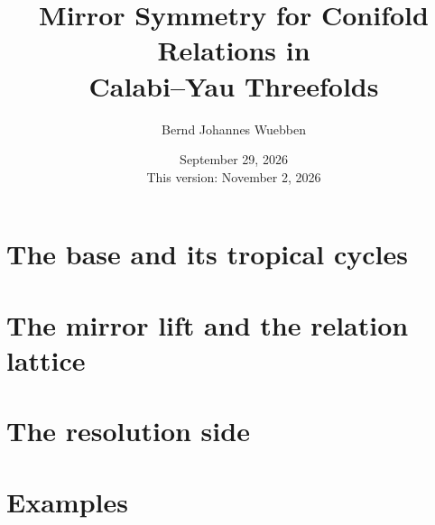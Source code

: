\documentclass[11pt]{amsart}
\title[Mirror Symmetry for Conifold Relations]{Mirror Symmetry for Conifold Relations in\\ Calabi--Yau Threefolds}
\author{Bernd Johannes Wuebben}
\date{September 29, 2026\\This version: November 2, 2026}
\theoremstyle{definition}
\theoremstyle{remark}
\numberwithin{equation}{section}
\begin{document}
\begin{abstract}

\end{abstract}
\maketitle
\newpage
\tableofcontents
\newpage


\part{The base and its tropical cycles}



\part{The mirror lift and the relation lattice}




\part{The resolution side}

\part{Examples}


\appendix










\end{document}
